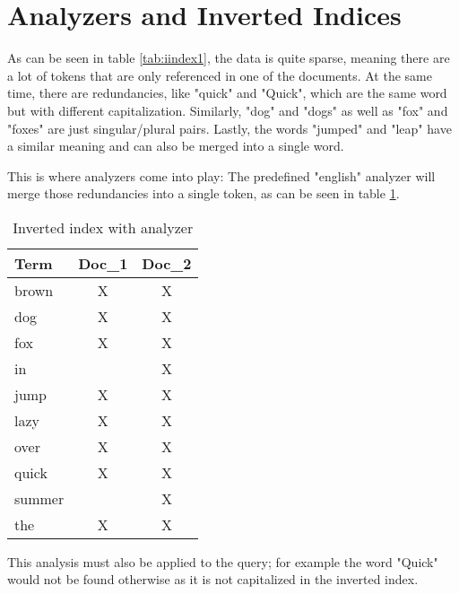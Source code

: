 \section{Analyzers and Inverted Indices}
As can be seen in table \ref{tab:iindex1}, the data is quite sparse, meaning there are a lot of tokens that are only referenced in one of the documents. At the same time, there are redundancies, like "quick" and "Quick", which are the same word but with different capitalization. Similarly, "dog" and "dogs" as well as "fox" and "foxes" are just singular/plural pairs. Lastly, the words "jumped" and "leap" have a similar meaning and can also be merged into a single word.

This is where analyzers come into play: The predefined "english" analyzer will merge those redundancies into a single token, as can be seen in table \ref{tab:iindex3}.

\begin{table}[H]
    \centering
    \begin{tabular}{ | l | c | c | }
        \hline
        Term    & Doc\_1 & Doc\_2 \\ \hline
        \hline
        brown   &   X   &  X  \\
        dog     &   X   &  X  \\
        fox     &   X   &  X  \\
        in      &       &  X  \\
        jump    &   X   &  X  \\
        lazy    &   X   &  X  \\
        over    &   X   &  X  \\
        quick   &   X   &  X  \\
        summer  &       &  X  \\
        the     &   X   &  X  \\
        \hline
    \end{tabular}
    \caption{Inverted index with analyzer \autocite{elasticsearch_iindex}}
    \label{tab:iindex3}
\end{table}

This analysis must also be applied to the query; for example the word "Quick" would not be found otherwise as it is not capitalized in the inverted index.
